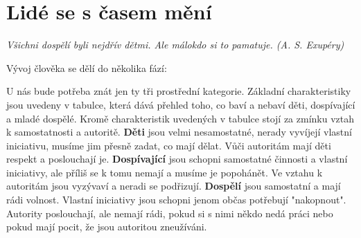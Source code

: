 \documentclass[a4paper,12pt,final]{report}
\begin{document}
\section[Lidé se s časem mění]{Lidé se s časem mění}
\pagelogos
\textit{Všichni dospělí byli nejdřív dětmi. Ale málokdo si to pamatuje. (A. S. Exupéry)}

\begin{samepage}
Vývoj člověka se dělí do několika fází:
\end{samepage}

U nás bude potřeba znát jen ty tři prostřední kategorie. Základní charakteristiky jsou uvedeny v tabulce, která dává přehled toho, co baví a nebaví děti, dospívající a mladé dospělé. Kromě charakteristik uvedených v tabulce stojí za zmínku vztah k samostatnosti a autoritě. \textbf{Děti} jsou velmi nesamostatné, nerady vyvíjejí vlastní iniciativu, musíme jim přesně zadat, co mají dělat. Vůči autoritám mají děti respekt a poslouchají je. \textbf{Dospívající} jsou schopni samostatné činnosti a vlastní iniciativy, ale příliš se k tomu nemají a musíme je popohánět. Ve vztahu k autoritám jsou vyzývaví a neradi se podřizují. \textbf{Dospělí} jsou samostatní a mají rádi volnost. Vlastní iniciativy jsou schopni jenom občas potřebují "nakopnout". Autority poslouchají, ale nemají rádi, pokud si s nimi někdo nedá práci nebo pokud mají pocit, že jsou autoritou zneužíváni.
\end{document}
